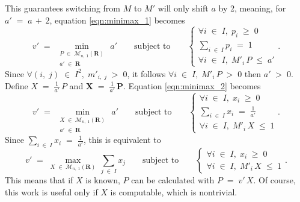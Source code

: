 \documentclass{report}
\theoremstyle{definition}
\theoremstyle{plain}
\begin{document}
This guarantees switching from $M$ to $M'$ will only shift $a$ by 2, meaning,
for $a'\;=\;a\,+\,2$, equation \ref{eqn:minimax_1} becomes
\begin{equation}
	v'\;=\;\min_{\substack{P\;\in\;\mathscr M_{n,\;1}\left(\mathbf R\right)\\a'\;\in\;\mathbf R}}\,a'
		\qquad\text{subject to}\qquad
		\begin{cases}
		\forall i\;\in\;I,\;p_i\;\geqslant\;0 \\
		\sum_{i\;\in\;I}p_i\;=\;1 \\
		\forall i\;\in\;I,\;M'_i\,P\;\leqslant\;a'
		\end{cases}.
	\label{eqn:minimax_2}
\end{equation}
Since $\forall\left(i,\;j\right)\;\in\;I^2,\;m'_{i,\;j}\;>\;0$, it follows
$\forall i\;\in\;I,\;M'_i\,P\;>\;0$ then $a'\;>\;0$. Define
$X\;=\;\frac1{a'}\,P$ and $\mathbf X\;=\;\frac1{a'}\,\mathbf P$. Equation
\ref{eqn:minimax_2} becomes
\[
	v'\;=\;\min_{\substack{X\;\in\;\mathscr M_{n,\;1}\left(\mathbf R\right)\\a'\;\in\;\mathbf R}}\,a'
		\qquad\text{subject to}\qquad
		\begin{cases}
		\forall i\;\in\;I,\;x_i\;\geqslant\;0 \\
		\sum_{i\;\in\;I}x_i\;=\;\frac1{a'} \\
		\forall i\;\in\;I,\;M'_i\,X\;\leqslant\;1
		\end{cases}.
\]
Since $\sum_{i\;\in\;I}x_i\;=\;\frac1{a'}$, this is equivalent to
\begin{equation}
	v'\;=\;\max_{X\;\in\;\mathscr M_{n,\;1}\left(\mathbf R\right)}\,\sum_{j\;\in\;I}x_j
		\qquad\text{subject to}\qquad
		\begin{cases}
		\forall i\;\in\;I,\;x_i\;\geqslant\;0 \\
		\forall i\;\in\;I,\;M'_i\,X\;\leqslant\;1
		\end{cases}.
	\label{eqn:simplex_problem_minimax}
\end{equation}
This means that if $X$ is known, $P$ can be calculated with $P\;=\;v'\,X$. Of
course, this work is useful only if $X$ is computable, which is nontrivial.
\end{document}
